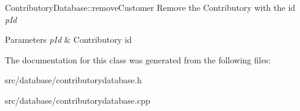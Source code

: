 Contributory\+Database\+::remove\+Customer Remove the Contributory with the id {\itshape p\+Id} 


\begin{DoxyParams}{Parameters}
{\em p\+Id} & Contributory id \\
\hline
\end{DoxyParams}


The documentation for this class was generated from the following files\+:\begin{DoxyCompactItemize}
\item 
src/database/contributorydatabase.\+h\item 
src/database/contributorydatabase.\+cpp\end{DoxyCompactItemize}
